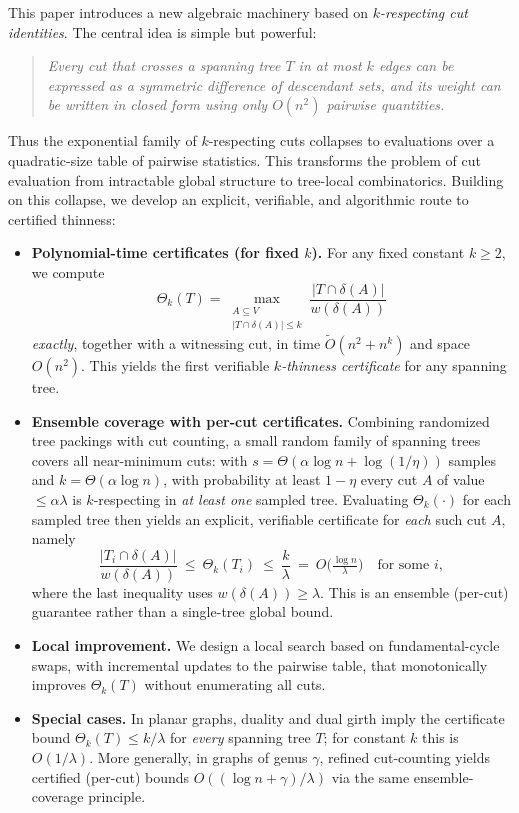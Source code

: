 \documentclass[11pt,letterpaper]{article}
\begin{document}
This paper introduces a new algebraic machinery based on
\emph{$k$-respecting cut identities}.  
The central idea is simple but powerful:
\begin{quote}
\emph{Every cut that crosses a spanning tree $T$ in at most $k$ edges can be
expressed as a symmetric difference of descendant sets, and its weight can be
written in closed form using only $O(n^2)$ pairwise quantities.}
\end{quote}
Thus the exponential family of $k$-respecting cuts collapses to evaluations over
a quadratic-size table of pairwise statistics. This transforms the problem of
cut evaluation from intractable global structure to tree-local combinatorics.
Building on this collapse, we develop an explicit, verifiable, and
algorithmic route to certified thinness:

\begin{itemize}
  \item \textbf{Polynomial-time certificates (for fixed $k$).}
  For any fixed constant $k\ge 2$, we compute
  \[
    \Theta_k(T)=\max_{\substack{A\subseteq V\\ \lvert T\cap\delta(A)\rvert\le k}}
    \frac{\lvert T\cap\delta(A)\rvert}{w(\delta(A))} 
  \]
  \emph{exactly}, together with a witnessing cut, in time
  $\tilde{O}(n^2 + n^k)$ and space $O(n^2)$. This yields the first verifiable
  \emph{$k$-thinness certificate} for any spanning tree.

  \item \textbf{Ensemble coverage with per-cut certificates.}
  Combining randomized tree packings with cut counting, a small random family
  of spanning trees covers all near-minimum cuts: with
  $s=\Theta(\alpha\log n+\log(1/\eta))$ samples and $k=\Theta(\alpha\log n)$,
  with probability at least $1-\eta$ every cut $A$ of value $\le \alpha\lambda$
  is $k$-respecting in \emph{at least one} sampled tree. Evaluating
  $\Theta_k(\cdot)$ for each sampled tree then yields an explicit, verifiable
  certificate for \emph{each} such cut $A$, namely
  \[
     \frac{|T_i\cap\delta(A)|}{w(\delta(A))}\ \le\ \Theta_k(T_i)\ \le\ \frac{k}{\lambda}
     \ =\ O\!\Big(\tfrac{\log n}{\lambda}\Big)\quad\text{for some }i,
  \]
  where the last inequality uses $w(\delta(A))\ge \lambda$. This is an
  ensemble (per-cut) guarantee rather than a single-tree global bound.

  \item \textbf{Local improvement.}
  We design a local search based on fundamental-cycle swaps, with incremental
  updates to the pairwise table, that monotonically improves $\Theta_k(T)$
  without enumerating all cuts.

  \item \textbf{Special cases.}
  In planar graphs, duality and dual girth imply the certificate bound
  $\Theta_k(T)\le k/\lambda$ for \emph{every} spanning tree $T$; for constant
  $k$ this is $O(1/\lambda)$. More generally, in graphs of genus
  $\gamma$, refined cut-counting yields certified (per-cut) bounds
  $O((\log n+\gamma)/\lambda)$ via the same ensemble-coverage principle.
\end{itemize}
\end{document}
